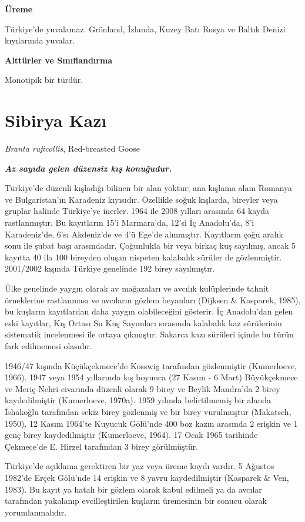 \documentclass[
  a4paper,
  DIV=11,
  numbers=noendperiod]{scrreprt}
\begin{document}
\textbf{Üreme}

Türkiye'de yuvalamaz. Grönland, İzlanda, Kuzey Batı Rusya ve Baltık
Denizi kıyılarında yuvalar.

\textbf{Alttürler ve Sınıflandırma}

Monotipik bir türdür.

\section{Sibirya Kazı}\label{sibirya-kazux131}

\emph{Branta ruficollis}, Red-breasted Goose

\textbf{\emph{Az sayıda gelen düzensiz kış konuğudur.}}

Türkiye'de düzenli kışladığı bilinen bir alan yoktur; ana kışlama alanı
Romanya ve Bulgaristan'ın Karadeniz kıyısıdır. Özellikle soğuk kışlarda,
bireyler veya gruplar halinde Türkiye'ye inerler. 1964 ile 2008 yılları
arasında 64 kayda rastlanmıştır. Bu kayıtların 15'i Marmara'da, 12'si İç
Anadolu'da, 8'i Karadeniz'de, 6'sı Akdeniz'de ve 4'ü Ege'de alınmıştır.
Kayıtların çoğu aralık sonu ile şubat başı arasındadır. Çoğunlukla bir
veya birkaç kuş sayılmış, ancak 5 kayıtta 40 ila 100 bireyden oluşan
nispeten kalabalık sürüler de gözlenmiştir. 2001/2002 kışında Türkiye
genelinde 192 birey sayılmıştır.

Ülke genelinde yaygın olarak av mağazaları ve avcılık kulüplerinde
tahnit örneklerine rastlanması ve avcıların gözlem beyanları (Dijksen \&
Kasparek, 1985), bu kuşların kayıtlardan daha yaygın olabileceğini
gösterir. İç Anadolu'dan gelen eski kayıtlar, Kış Ortası Su Kuş
Sayımları sırasında kalabalık kaz sürülerinin sistematik incelenmesi ile
ortaya çıkmıştır. Sakarca kazı sürüleri içinde bu türün fark edilmemesi
olasıdır.

1946/47 kışında Küçükçekmece'de Kosswig tarafından gözlenmiştir
(Kumerloeve, 1966). 1947 veya 1954 yıllarında kış boyunca (27 Kasım - 6
Mart) Büyükçekmece ve Meriç Nehri civarında düzenli olarak 9 birey ve
Beylik Mandra'da 2 birey kaydedilmiştir (Kumerloeve, 1970a). 1959
yılında belirtilmemiş bir alanda İshakoğlu tarafından sekiz birey
gözlenmiş ve bir birey vurulmuştur (Makatsch, 1950). 12 Kasım 1964'te
Kuyucuk Gölü'nde 400 boz kazın arasında 2 erişkin ve 1 genç birey
kaydedilmiştir (Kumerloeve, 1964). 17 Ocak 1965 tarihinde Çekmece'de E.
Hirzel tarafından 3 birey görülmüştür.

Türkiye'de açıklama gerektiren bir yaz veya üreme kaydı vardır. 5
Ağustos 1982'de Erçek Gölü'nde 14 erişkin ve 8 yavru kaydedilmiştir
(Kasparek \& Ven, 1983). Bu kayıt ya hatalı bir gözlem olarak kabul
edilmeli ya da avcılar tarafından yakalanıp evcilleştirilen kuşların
üremesinin bir sonucu olarak yorumlanmalıdır.
\end{document}
